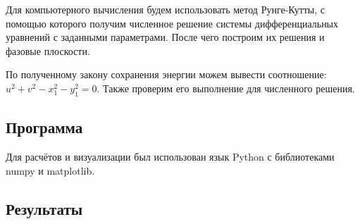         Для компьютерного вычисления будем использовать метод Рунге-Кутты, с помощью которого получим численное решение системы дифференциальных уравнений с заданными параметрами. После чего построим их решения и фазовые плоскости.

        По полученному закону сохранения энергии можем вывести соотношение: \( u^2 + v^2 - x_1^2 - y_1^2 = 0 \). Также проверим его выполнение для численного решения.



    \subsection{Программа}
        Для расчётов и визуализации был использован язык Python с библиотеками numpy и matplotlib.

    \subsection{Результаты}

